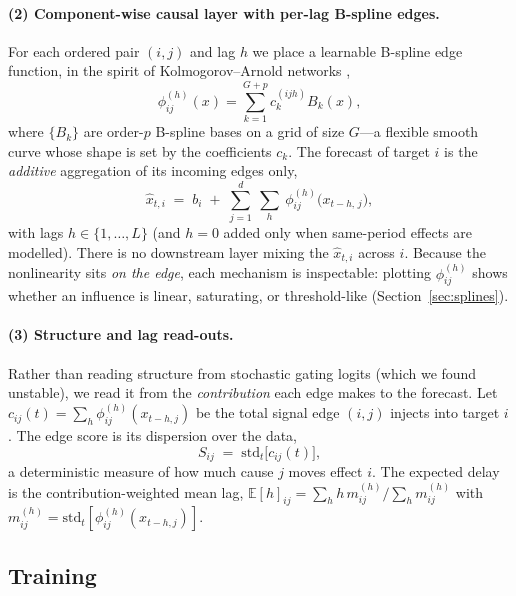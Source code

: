 \paragraph{(2) Component-wise causal layer with per-lag B-spline edges.}
For each ordered pair $(i,j)$ and lag $h$ we place a learnable B-spline edge
function, in the spirit of Kolmogorov--Arnold networks \citep{Liu2024},
\begin{equation}
    \phi^{(h)}_{ij}(x) = \sum_{k=1}^{G+p} c^{(ijh)}_k B_k(x),
    \label{eq:spline}
\end{equation}
where $\{B_k\}$ are order-$p$ B-spline bases on a grid of size $G$---a flexible
smooth curve whose shape is set by the coefficients $c_k$. The forecast of target
$i$ is the \emph{additive} aggregation of its incoming edges only,
\begin{equation}
    \hat{x}_{t,i} \;=\; b_i \;+\; \sum_{j=1}^{d}\ \sum_{h}\ \phi^{(h)}_{ij}\!\big(x_{t-h,\,j}\big),
    \label{eq:predict}
\end{equation}
with lags $h\in\{1,\dots,L\}$ (and $h=0$ added only when same-period effects are
modelled). There is no downstream layer mixing the $\hat{x}_{t,i}$ across $i$.
Because the nonlinearity sits \emph{on the edge}, each mechanism is inspectable:
plotting $\phi^{(h)}_{ij}$ shows whether an influence is linear, saturating, or
threshold-like (Section~\ref{sec:splines}).

\paragraph{(3) Structure and lag read-outs.}
Rather than reading structure from stochastic gating logits (which we found
unstable), we read it from the \emph{contribution} each edge makes to the
forecast. Let $c_{ij}(t)=\sum_h \phi^{(h)}_{ij}(x_{t-h,j})$ be the total signal
edge $(i,j)$ injects into target $i$. The edge score is its dispersion over the
data,
\begin{equation}
    S_{ij} \;=\; \mathrm{std}_t\big[c_{ij}(t)\big],
    \label{eq:importance}
\end{equation}
a deterministic measure of how much cause $j$ moves effect $i$. The expected
delay is the contribution-weighted mean lag,
$\mathbb{E}[h]_{ij}=\sum_h h\,m^{(h)}_{ij}/\sum_h m^{(h)}_{ij}$ with
$m^{(h)}_{ij}=\mathrm{std}_t[\phi^{(h)}_{ij}(x_{t-h,j})]$.

\subsection{Training}
\label{sec:opt}

